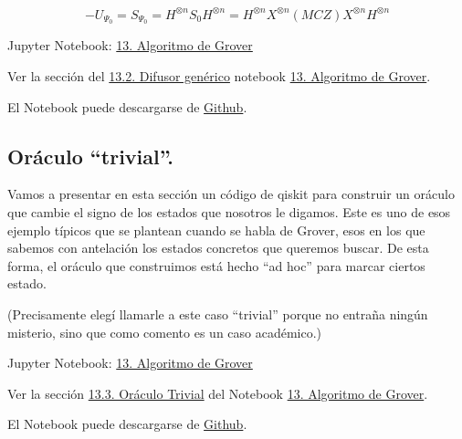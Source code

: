 \documentclass[a4paper,11pt]{book} %
\numberwithin{equation}{chapter}
\begin{document}
\begin{equation} \label{ec_qiskit_diff-gen_U_Psi0}
\boxed{-U_{\Psi_0}  = S_{\Psi_0}  = H^{\otimes n} S_0 H^{\otimes n} = H^{\otimes n} X^{\otimes n} (MCZ) X^{\otimes n} H^{\otimes n}} 
\end{equation} 


    \begin{mybox_orange}{Jupyter Notebook: \href{https://www.scbi.uma.es/web/wp-content/uploads/Jupyterbook/CICC_UMA/Notebooks/html/docs/Part_01/Chapter_13-Grover_Algorithm_myst.html}{13. Algoritmo de Grover}}
  
    Ver la sección  del \href{https://www.scbi.uma.es/web/wp-content/uploads/Jupyterbook/CICC_UMA/Notebooks/html/docs/Part_01/Chapter_13-Grover_Algorithm_myst.html#difusor-generico}{13.2. Difusor genérico} notebook \href{https://www.scbi.uma.es/web/wp-content/uploads/Jupyterbook/CICC_UMA/Notebooks/html/docs/Part_01/Chapter_13-Grover_Algorithm_myst.html}{13. Algoritmo de Grover}. 
    
  	El Notebook puede descargarse de \href{https://github.com/davidcb98/CICC_UMA/blob/master/Notebooks/Part_01/Chapter_13-Grover_Algorithm.ipynb}{Github}.
    \end{mybox_orange}

\subsection{Oráculo ``trivial''.}

Vamos a presentar en esta sección un código de qiskit para construir un oráculo que cambie el signo de los estados que nosotros le digamos. Este es uno de esos ejemplo típicos que se plantean cuando se habla de Grover, esos en los que sabemos con antelación los estados concretos que queremos buscar. De esta forma, el oráculo que construimos está hecho ``ad hoc'' para marcar ciertos estado. 

(Precisamente elegí llamarle a este caso ``trivial'' porque no entraña ningún misterio, sino que como comento es un caso académico.)

    \begin{mybox_orange}{Jupyter Notebook: \href{https://www.scbi.uma.es/web/wp-content/uploads/Jupyterbook/CICC_UMA/Notebooks/html/docs/Part_01/Chapter_13-Grover_Algorithm_myst.html}{13. Algoritmo de Grover}}
  
   Ver la sección \href{https://www.scbi.uma.es/web/wp-content/uploads/Jupyterbook/CICC_UMA/Notebooks/html/docs/Part_01/Chapter_13-Grover_Algorithm_myst.html#oraculo-trivial}{13.3. Oráculo Trivial} del  Notebook \href{https://www.scbi.uma.es/web/wp-content/uploads/Jupyterbook/CICC_UMA/Notebooks/html/docs/Part_01/Chapter_13-Grover_Algorithm_myst.html}{13. Algoritmo de Grover}. 
    
  	El Notebook puede descargarse de \href{https://github.com/davidcb98/CICC_UMA/blob/master/Notebooks/Part_01/Chapter_13-Grover_Algorithm.ipynb}{Github}.
    \end{mybox_orange}
\end{document}
